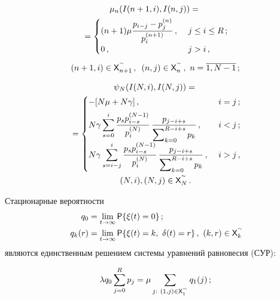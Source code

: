 \begin{multicols}{2}
  \vspace*{-12pt}
  
  \noindent
  \begin{multline}
  \mu_n(I(n+1,i), I(n,j))={}\\
  {}=\begin{cases}
  \displaystyle (n+1)\mu \fr{p_{i-j}-p_j^{(n)}}{p_i^{(n+1)}}\,, &\ j\leq i\leq R\,;\\
  0\,, &\ j>i\,,
  \end{cases}\\[5pt]
    (n+1,i)\in {\sf X}^{\sptilde}_{n+1}\,,\enskip
  (n,j)\in {\sf X}_n^{\sptilde}\,,\ n=\overline{1,N-1}\,;
  \label{e3-sop}
  \end{multline}
  
  \vspace*{-12pt}
  
  \noindent
  \begin{multline}
  \psi_N(I(N,i), I(N,j))={}\\
  {}=\begin{cases}
  -[N\mu +N\gamma]\,, &\ i=j\,;\\[5pt]
  \displaystyle N\gamma \sum\limits_{s=0}^i  \fr{p_s p_{i-s}^{(N-
1)}}{p_i^{(N)}}\,\fr{p_{j-i+s}} {\sum\nolimits_{k=0}^{R-i+s} p_k}\,, &\ i<j\,;\\[5pt]
  \displaystyle N\gamma \sum\limits^i_{s=i-j} \fr{p_s p_{i-s}^{(N-
1)}}{p_i^{(N)}}\,\fr{p_{j-i+s}}{\sum\nolimits_{k=0}^{R-i+s} p_k}\,, &\ i>j\,,
  \end{cases}\\
  (N,i),(N,j)\in {\sf X}_N^{\sptilde}\,.
  \label{e4-sop}
  \end{multline}
  
  
  Стационарные вероятности 
  \begin{align}
  q_0 &= \lim\limits_{t\to\infty} {\sf P}\{\xi(t)=0\}\,;\label{e5-sop}
\\
 q_k(r) &= \lim\limits_{t\to\infty} {\sf P}\{\xi(t)=k, \ \delta(t)=r\}\,,\ (k,r)\in {\sf 
X}_k^{\sptilde}\!\!
  \label{e6-sop}
  \end{align}
являются единственным решением системы уравнений равновесия (СУР):

\noindent
\begin{equation*}
\lambda q_0\sum\limits^R_{j=0} p_j =\mu \sum\limits_{j:\ (1,j)\in {\sf 
X}_1^{\sptilde}} q_1(j)\,;
\end{equation*}

\vspace*{-12pt}


\end{multicols}
